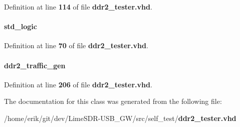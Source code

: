 Definition at line {\bf 114} of file {\bf ddr2\+\_\+tester.\+vhd}.

\paragraph[{local\+\_\+init\+\_\+done}]{ {\bfseries \textcolor{comment}{std\+\_\+logic}\textcolor{vhdlchar}{ }} \hspace{0.3cm}{\ttfamily [Signal]}}\label{classddr2__tester_1_1arch_a0eee8e94eb37a696902043166c79b21c}


Definition at line {\bf 70} of file {\bf ddr2\+\_\+tester.\+vhd}.

\paragraph[{traffic\+\_\+gen\+\_\+inst}]{ {\bfseries \textcolor{vhdlchar}{ddr2\+\_\+traffic\+\_\+gen}\textcolor{vhdlchar}{ }} \hspace{0.3cm}{\ttfamily [Instantiation]}}\label{classddr2__tester_1_1arch_a030388a31daca212211c9e152a315e04}


Definition at line {\bf 206} of file {\bf ddr2\+\_\+tester.\+vhd}.



The documentation for this class was generated from the following file\+:\begin{DoxyCompactItemize}
\item 
/home/erik/git/dev/\+Lime\+S\+D\+R-\/\+U\+S\+B\+\_\+\+G\+W/src/self\+\_\+test/{\bf ddr2\+\_\+tester.\+vhd}\end{DoxyCompactItemize}
